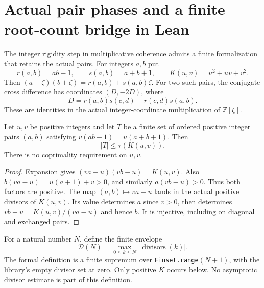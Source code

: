\section{Actual pair phases and a finite root-count bridge in Lean}
\label{afc-section}

The integer rigidity step in multiplicative coherence admits a finite
formalization that retains the actual pairs. For integers $a,b$ put
\[
 r(a,b)=ab-1,\qquad s(a,b)=a+b+1,
 \qquad K(u,v)=u^2+uv+v^2.
\]
Then $(a+\zeta)(b+\zeta)=r(a,b)+s(a,b)\zeta$. For two such pairs,
the conjugate cross difference has coordinates $(D,-2D)$, where
\[
 D=r(a,b)s(c,d)-r(c,d)s(a,b).
\]
These are identities in the actual integer-coordinate multiplication
of $\mathbb Z[\zeta]$.

\begin{lemma}\label{afc-divisor}
Let $u,v$ be positive integers and let $T$ be a finite set of ordered
positive integer pairs $(a,b)$ satisfying $v(ab-1)=u(a+b+1)$.
Then
\[
 |T|\le\tau(K(u,v)).
\]
There is no coprimality requirement on $u,v$.
\end{lemma}
\begin{proof}
Expansion gives $(va-u)(vb-u)=K(u,v)$. Also
$b(va-u)=u(a+1)+v>0$, and similarly $a(vb-u)>0$.
Thus both factors are positive. The map $(a,b)\mapsto va-u$
lands in the actual positive divisors of $K(u,v)$. Its value determines
$a$ since $v>0$, then determines $vb-u=K(u,v)/(va-u)$ and hence $b$.
It is injective, including on diagonal and exchanged pairs.
\end{proof}

For a natural number $N$, define the finite envelope
\[
 \mathcal D(N)=\max_{0\le k\le N}
       |\operatorname{divisors}(k)|.
\]
The formal definition is a finite supremum over
\texttt{Finset.range}$(N+1)$, with the library's empty divisor set at zero.
Only positive $K$ occurs below. No asymptotic divisor estimate is part
of this definition.

